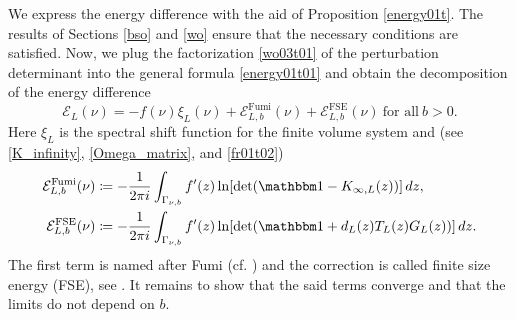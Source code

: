 We express the energy difference with the aid of Proposition \ref{energy01t}.
The results of Sections \ref{bso} and \ref{wo} ensure that the necessary conditions are satisfied.
Now, we plug the factorization \eqref{wo03t01} of the perturbation determinant
into the general formula \eqref{energy01t01} and obtain the decomposition of the energy difference  
\begin{equation}\label{asymptotics01}
  \mathcal{E}_L(\nu)= - f(\nu)\xi_L(\nu) + \mathcal{E}_{L,b}^{\text{Fumi}}(\nu) + \mathcal{E}_{L,b}^{\text{FSE}}(\nu)
  \ \text{for all}\ b>0 .
\end{equation}
Here $\xi_L$ is the spectral shift function for the finite volume system and
(see \eqref{K_infinity}, \eqref{Omega_matrix}, and \eqref{fr01t02})
\begin{align}
      \mathcal{E}_{L,b}^{\text{Fumi}}(\nu) & \coloneqq - \frac{1}{2\pi i}\int_{\Gamma_{\nu,b}} f'(z)
              \ln[\det(\id - K_{\infty,L}(z))]\, dz , \label{E_L_Fumi}\\
      \mathcal{E}_{L,b}^{\text{FSE}}(\nu)  & \coloneqq - \frac{1}{2\pi i}\int_{\Gamma_{\nu,b}} f'(z) 
              \ln[\det(\id + d_L(z)T_L(z) G_L(z))]\, dz . \label{E_L_FSE}
\end{align}
The first term is named after Fumi \cite{Fumi1955} (cf. \cite{Affleck1997})
and the correction is called finite size energy (FSE), see \cite{Affleck1997}.
It remains to show that the said terms converge and that the limits do not depend on $b$.
